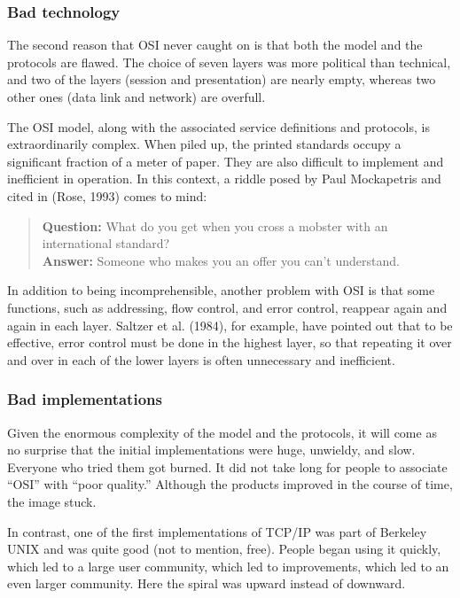 \documentclass[b5paper,11pt]{memoir}
\begin{document}
\subsubsection{Bad technology}

The second reason that OSI never caught on is that both the model and
the protocols are flawed. The choice of seven layers was more political
than technical, and two of the layers (session and presentation) are
nearly empty, whereas two other ones (data link and network) are
overfull.

The OSI model, along with the associated service definitions and protocols, is extraordinarily complex.
When piled up, the printed standards occupy a significant fraction of a meter of paper.
They are also difficult to implement and inefficient in operation.
In this context, a riddle posed by Paul Mockapetris and cited in (Rose, 1993) comes to mind:

\begin{quote}
   \textbf{Question:}
   What do you get when you cross a mobster with an international standard?\\
   \textbf{Answer:}
   Someone who makes you an offer you can't understand.
\end{quote}

In addition to being incomprehensible, another problem with OSI is that
some functions, such as addressing, flow control, and error control,
reappear again and again in each layer. Saltzer et al. (1984), for
example, have pointed out that to be effective, error control must be
done in the highest layer, so that repeating it over and over in each of
the lower layers is often unnecessary and inefficient.



\subsubsection{Bad implementations}

Given the enormous complexity of the model and the protocols, it will
come as no surprise that the initial implementations were huge,
unwieldy, and slow. Everyone who tried them got burned. It did not take
long for people to associate ``OSI'' with ``poor quality.''
Although the products improved in the course of time, the image stuck.

In contrast, one of the first implementations of TCP/IP was part of
Berkeley UNIX and was quite good (not to mention, free). People began
using it quickly, which led to a large user community, which led to
improvements, which led to an even larger community. Here the spiral was
upward instead of downward.
\end{document}
